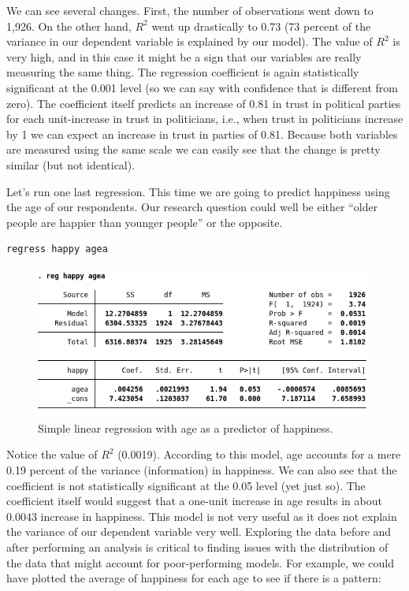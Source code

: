 \documentclass{article}
\begin{document}
We can see several changes. First, the number of observations went down to 1,926. On the other hand, $R^2$ went up drastically to 0.73 (73 percent of the variance in our dependent variable is explained by our model). The value of $R^2$ is very high, and in this case it might be a sign that our variables are really measuring the same thing. The regression coefficient is again statistically significant at the 0.001 level (so we can say with confidence that is different from zero). The coefficient itself predicts an increase of 0.81 in trust in political parties for each unit-increase in trust in politicians, i.e., when trust in politicians increase by 1 we can expect an increase in trust in parties of 0.81. Because both variables are measured using the same scale we can easily see that the change is pretty similar (but not identical).

Let's run one last regression. This time we are going to predict happiness using the age of our respondents. Our research question could well be either ``older people are happier than younger people'' or the opposite.

\begin{lstlisting}
regress happy agea
\end{lstlisting}

\begin{figure}[H]
	\includegraphics[width=\linewidth]{../img/reg3.png}
	\caption{Simple linear regression with age as a predictor of happiness.}
\end{figure}

Notice the value of $R^2$ (0.0019). According to this model, age accounts for a mere 0.19 percent of the variance (information) in happiness. We can also see that the coefficient is not statistically significant at the 0.05 level (yet just so). The coefficient itself would suggest that a one-unit increase in age results in about 0.0043 increase in happiness. This model is not very useful as it does not explain the variance of our dependent variable very well. Exploring the data before and after performing an analysis is critical to finding issues with the distribution of the data that might account for poor-performing models. For example, we could have plotted the average of happiness for each age to see if there is a pattern:
\end{document}
